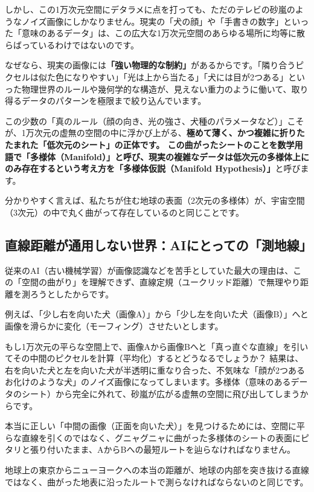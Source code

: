 しかし、この1万次元空間にデタラメに点を打っても、ただのテレビの砂嵐のようなノイズ画像にしかなりません。現実の「犬の顔」や「手書きの数字」といった「意味のあるデータ」は、この広大な1万次元空間のあらゆる場所に均等に散らばっているわけではないのです。

なぜなら、現実の画像には\textbf{「強い物理的な制約」}があるからです。「隣り合うピクセルは似た色になりやすい」「光は上から当たる」「犬には目が2つある」といった物理世界のルールや幾何学的な構造が、見えない重力のように働いて、取り得るデータのパターンを極限まで絞り込んでいます。

この少数の「真のルール（顔の向き、光の強さ、犬種のパラメータなど）」こそが、1万次元の虚無の空間の中に浮かび上がる、\textbf{極めて薄く、かつ複雑に折りたたまれた「低次元のシート」の正体です。 この曲がったシートのことを数学用語で「多様体（Manifold）」と呼び、現実の複雑なデータは低次元の多様体上にのみ存在するという考え方を「多様体仮説（Manifold Hypothesis）」}と呼びます。

分かりやすく言えば、私たちが住む地球の表面（2次元の多様体）が、宇宙空間（3次元）の中で丸く曲がって存在しているのと同じことです。

\subsection{直線距離が通用しない世界：AIにとっての「測地線」}

従来のAI（古い機械学習）が画像認識などを苦手としていた最大の理由は、この「空間の曲がり」を理解できず、直線定規（ユークリッド距離）で無理やり距離を測ろうとしたからです。

例えば、「少し右を向いた犬（画像A）」から「少し左を向いた犬（画像B）」へと画像を滑らかに変化（モーフィング）させたいとします。

もし1万次元の平らな空間上で、画像Aから画像Bへと「真っ直ぐな直線」を引いてその中間のピクセルを計算（平均化）するとどうなるでしょうか？ 結果は、右を向いた犬と左を向いた犬が半透明に重なり合った、不気味な「顔が2つあるお化けのような犬」のノイズ画像になってしまいます。多様体（意味のあるデータのシート）から完全に外れて、砂嵐が広がる虚無の空間に飛び出してしまうからです。

本当に正しい「中間の画像（正面を向いた犬）」を見つけるためには、空間に平らな直線を引くのではなく、グニャグニャに曲がった多様体のシートの表面にピタリと張り付いたまま、AからBへの最短ルートを辿らなければなりません。

地球上の東京からニューヨークへの本当の距離が、地球の内部を突き抜ける直線ではなく、曲がった地表に沿ったルートで測らなければならないのと同じです。

